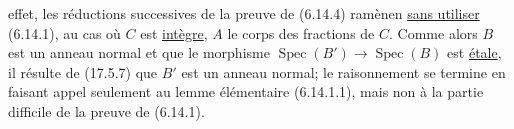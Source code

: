 effet, les réductions successives de la preuve de (6.14.4) ramènen \uline{sans utiliser} (6.14.1), au cas où $C$ est \inserted{/} \uline{intègre}, $A$ le corps des fractions de $C$. Comme alors $B$ est un anneau normal et que le morphisme $\operatorname{Spec}(B')\longrightarrow\operatorname{Spec}(B)$ est \uline{étale}, il résulte de (17.5.7) que $B'$ est un anneau  normal; le raisonnement se termine  en faisant appel seulement au lemme élémentaire  (6.14.1.1), mais non à la partie difficile de la preuve de (6.14.1).
